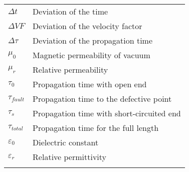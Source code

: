 \begin{longtable}[l]{@{}ll@{}}
    \( \Delta t \) & Deviation of the time\\
    \( \Delta VF \) & Deviation of the velocity factor\\
    \( \Delta \tau \) & Deviation of the propagation time\\
    \( \mu_0 \) & Magnetic permeability of vacuum\\
    \( \mu_r \) & Relative permeability\\
    \( \tau_0 \) & Propagation time with open end\\
    \( \tau_{fault} \) & Propagation time to the defective point\\
    \( \tau_s \) & Propagation time with short-circuited end\\
    \( \tau_{total} \) & Propagation time for the full length\\
    \( \varepsilon_0 \) & Dielectric constant\\
    \( \varepsilon_r \) & Relative permittivity\\
    \label{tab:glossar}
\end{longtable}
